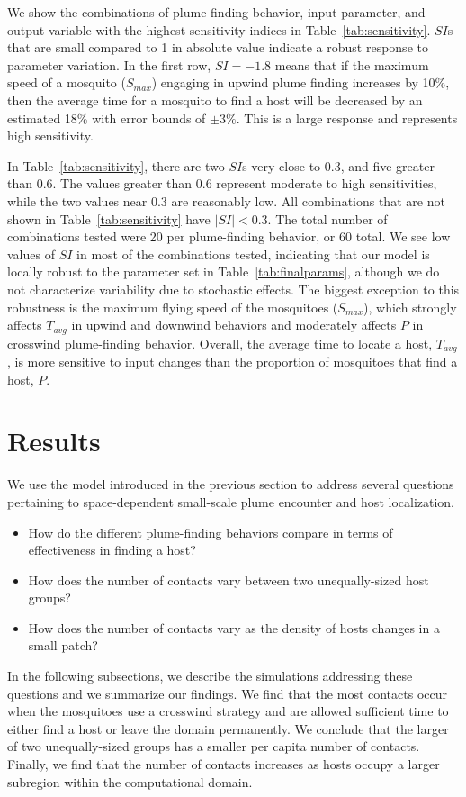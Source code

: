 \documentclass[10pt]{article}
\begin{document}
We show the combinations of plume-finding behavior, input parameter, and output variable with the highest sensitivity indices in Table~\ref{tab:sensitivity}. $SI$s that are small compared to 1 in absolute value indicate a robust response to parameter variation. In the first row, $SI = -1.8$ means that if the maximum speed of a mosquito ($S_{max}$) engaging in upwind plume finding increases by 10\%, then the average time for a mosquito to find a host will be decreased by an estimated 18\% with error bounds of $\pm 3\%$.  This is a large response and represents high sensitivity. 

In Table~\ref{tab:sensitivity}, there are two $SI$s very close to 0.3, and five greater than 0.6. The values greater than 0.6 represent moderate to high sensitivities, while the two values near 0.3 are reasonably low. All combinations that are not shown in Table~\ref{tab:sensitivity} have $|SI| < 0.3$. The total number of combinations tested were 20 per plume-finding behavior, or 60 total. We see low values of $SI$ in most of the combinations tested, indicating that our model is locally robust to the parameter set in Table~\ref{tab:finalparams}, although we do not characterize variability due to stochastic effects. The biggest exception to this robustness is the maximum flying speed of the mosquitoes ($S_{max}$), which strongly affects $T_{avg}$ in upwind and downwind behaviors and moderately affects $P$ in crosswind plume-finding behavior. Overall, the average time to locate a host, $T_{avg}$, is more sensitive to input changes than the proportion of mosquitoes that find a host, $P$. 


\section*{Results}
 We use the model introduced in the previous section to address several questions pertaining to space-dependent  small-scale plume encounter and host localization.
	\begin{itemize}
		\item How do the different plume-finding behaviors compare in terms of effectiveness in finding a host?
		\item How does the number of contacts vary between two unequally-sized host groups?
		\item How does the number of contacts vary as the density of hosts changes in a small patch?
	\end{itemize}
In the following subsections, we describe the simulations addressing these questions and we summarize our findings. We find that the most contacts occur when the mosquitoes use a crosswind strategy and are allowed sufficient time to either find a host or leave the domain permanently. We conclude that the larger of two unequally-sized groups has a smaller per capita number of contacts. Finally, we find that the number of contacts increases as hosts occupy a larger subregion within the computational domain.
	
\end{document}
